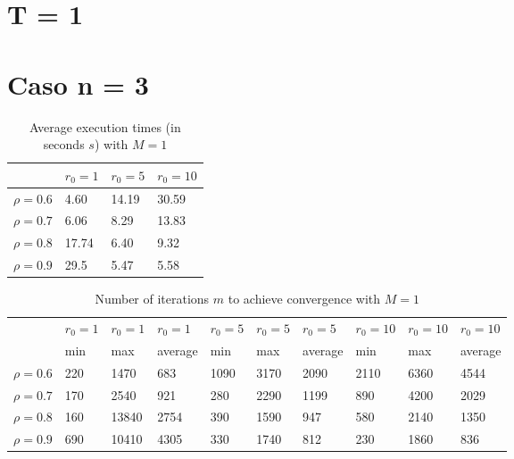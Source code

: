 \documentclass[a4paper,11pt,openright]{report}
\begin{document}
\section{T = 1}
\section*{Caso n = 3} 
\begin{table}[H]
\centering
\addtolength{\leftskip}{-1.5cm}
\addtolength{\rightskip}{-1.5cm}
\begin{tabular}{|c|lll|}
\hline
$ $ & $r_0 = 1$ & $r_0 = 5$ & $r_0 = 10$ \\
\hline
$\rho = 0.6$ & 4.60 & 14.19 & 30.59 \\

$\rho = 0.7$ & 6.06 & 8.29 & 13.83 \\

$\rho = 0.8$ & 17.74 & 6.40 & 9.32 \\

$\rho = 0.9$ & 29.5 & 5.47 & 5.58 \\
\hline
\end{tabular}
\caption{Average execution
 times (in seconds $s$) with $M = 1$}
\end{table}
\begin{table}[H]
\centering
\addtolength{\leftskip}{-1.5cm}
\addtolength{\rightskip}{-1.5cm}
\begin{tabular}{|c|lllllllll|}
\hline
$ $ & $r_0 = 1$ & $r_0 = 1$ & $r_0 = 1$ & $r_0 = 5$ & $r_0 = 5$ & $r_0 = 5$ & $r_0 = 10$ & $r_0 = 10$ & $r_0 = 10$  \\
$ $ & min & max & average & min & max & average & min & max & average \\ 
\hline
$\rho = 0.6$ & 220 & 1470 & 683 & 1090 & 3170 & 2090 & 2110 & 6360 & 4544 \\

$\rho = 0.7$ & 170 & 2540 & 921 & 280 & 2290 & 1199 & 890 & 4200 & 2029\\

$\rho = 0.8$ & 160 & 13840 & 2754 & 390 & 1590 & 947 & 580 & 2140 & 1350\\

$\rho = 0.9$ & 690 & 10410 & 4305 & 330 & 1740 & 812 & 230 & 1860 & 836\\
\hline
\end{tabular}
\caption{Number of iterations $m$ to achieve convergence with $M = 1$}
\end{table}
\end{document}
